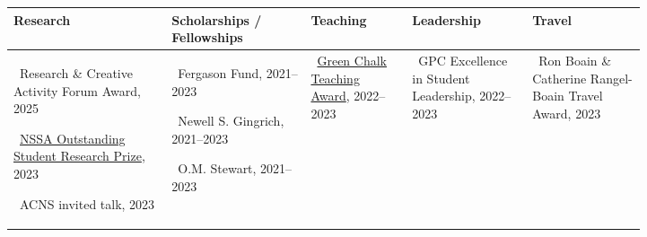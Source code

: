 \newcommand{\awarditem}[1]{\textbullet\ #1\par}

{\small
\setlength{\tabcolsep}{3pt}%
\renewcommand{\arraystretch}{1.08}%
\begin{tabularx}{\linewidth}{@{}>{\raggedright\arraybackslash}p{0.25\linewidth}
                                >{\raggedright\arraybackslash}p{0.22\linewidth}
                                >{\raggedright\arraybackslash}p{0.16\linewidth}
                                >{\raggedright\arraybackslash}p{0.19\linewidth}
                                >{\raggedright\arraybackslash}X@{}}
\toprule
Research & Scholarships / Fellowships & Teaching & Leadership & Travel \\
\midrule
\awarditem{Research \& Creative Activity Forum Award, 2025}
\awarditem{\href{https://neutronscattering.org/prizes/nssa-outstanding-student-research/}{NSSA Outstanding Student Research Prize}, 2023}
\awarditem{ACNS invited talk, 2023}
&
\awarditem{Fergason Fund, 2021--2023}
\awarditem{Newell S. Gingrich, 2021--2023}
\awarditem{O.M. Stewart, 2021--2023}
&
\awarditem{\href{https://physics.missouri.edu/news/david-beckwitt-receives-green-chalk-award}{Green Chalk Teaching Award}, 2022--2023}
&
\awarditem{GPC Excellence in Student Leadership, 2022--2023}
&
\awarditem{Ron Boain \& Catherine Rangel-Boain Travel Award, 2023}
\\
\bottomrule
\end{tabularx}\par
}
